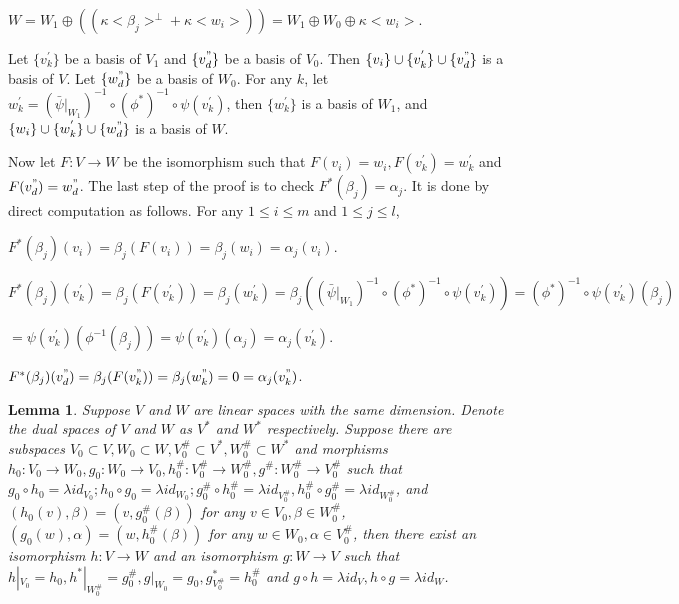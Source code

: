 \def\CTEXPreproc{Created by ctex v0.2.12, don't edit!}\documentclass[11pt]{article}
\newtheorem{lem}{Lemma}[section]
\begin{document}
\begin{pf}
$W= W_1 \oplus ( (\kappa<\beta_j>^{\perp}+\kappa<w_i>)  )= W_1 \oplus W_0 \oplus \kappa<w_i>$.

Let $\{ v^{'}_k \}$ be a basis of $V_1$ and $\{ v^{"}_d \}$ be a basis of $V_0$. Then $\{ v_i \} \cup \{ v^{'}_k \} \cup \{ v^{"}_d \} $ is a basis of $V$.  Let $\{ w^{"}_d \} $ be a basis of $W_0$. For any $k$, let $w^{'}_k = (\bar{\psi}|_{W_1})^{-1}\circ (\phi^*)^{-1}\circ \psi(v^{'}_k )$, then $\{ w^{'}_k \} $ is a basis of $W_1$, and $ \{ w_i \} \cup \{ w^{'}_k \} \cup \{ w^{"}_d \} $ is a basis of $W$.

Now let $F: V\rightarrow W$ be the isomorphism such that $F(v_i)=w_i , F(v^{'}_k )=w^{'}_k  $ and $ F(v^{"}_d )= w^{"}_d $.  The last step of the proof is to check $F^* (\beta_j )= \alpha_j $. It is done by direct computation as follows. For any $1\leq i\leq m$ and $1\leq j\leq l$,

$F^* (\beta_j )(v_i )=  \beta_j ( F(v_i)  )=  \beta_j (w_i )= \alpha_j (v_i )$.

$F^* (\beta_j )(v^{'}_k  )= \beta_j (  F( v^{'}_k ) )= \beta_j ( w^{'}_k )= \beta_j (   (\bar{\psi}|_{W_1})^{-1}\circ (\phi^*)^{-1}\circ \psi(v^{'}_k )    ) = (\phi^*)^{-1}\circ \psi (v^{'}_k)(\beta_j )$

$= \psi(v^{'}_k )( \phi^{-1}(\beta_j )   )= \psi(v^{'}_k )(\alpha_j) =\alpha_j (v^{'}_k)  $.

$F^* (\beta_j)(v^{"}_d)= \beta_j (  F(v^{"}_k) )=\beta_j (w^{"}_k)=0=\alpha_j(v^{"}_k)$.\\



\end{pf}

\begin{lem}
Suppose $V$ and $W$ are linear spaces with the same dimension. Denote the dual spaces of $V$ and $W$ as $V^{*}$ and $W^*$ respectively.
Suppose there are subspaces $V_0 \subset V  ,  W_0 \subset W , V^{\#}_0 \subset V^{*}, W^{\#}_0 \subset W^{*}$ and morphisms
$h_0 : V_0 \rightarrow W_0 , g_0 : W_0 \rightarrow V_0 , h^{\#}_0 : V^{\#}_0 \rightarrow W^{\#}_0 , g^{\#}: W^{\#}_0 \rightarrow V^{\#}_0 $ such that $g_0 \circ h_0 = \lambda id_{V_0 } ; h_0 \circ g_0 = \lambda id_{W_0 }; g^{\#}_0 \circ h^{\#}_0 =\lambda id_{V^{\#}_0 }, h^{\#}_0 \circ g^{\#}_0 =\lambda id_{W^{\#}_0 }$, and $ ( h_0 (v) , \beta   )= ( v, g^{\#}_0 (\beta)   )  $ for any $v\in V_0 , \beta \in W^{\#}_0 $, $ ( g_0 (w) , \alpha   )= ( w, h^{\#}_0 (\beta)   )  $ for any $w\in W_0 , \alpha \in V^{\#}_0 $, then there exist an isomorphism $h: V\rightarrow W$ and an isomorphism $g: W\rightarrow V  $ such that $h|_{V_0}=h_0 ,
   h^{*}|_{W^{\#}_0}=g^{\#}_0 , g|_{W_0 }= g_0 , g^{*}_{V^{\#}_0 }=h^{\#}_0 $ and $g\circ h = \lambda id_{V} , h\circ g =\lambda id_{W}$.



\end{lem}
\end{document}
